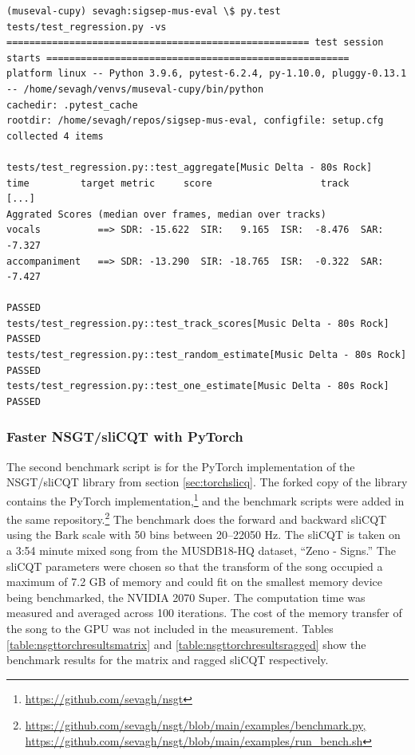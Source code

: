 \documentclass[report.tex]{subfiles}
\begin{document}
\begin{listing}[h]
  \centering
\begin{verbatim}
(museval-cupy) sevagh:sigsep-mus-eval \$ py.test tests/test_regression.py -vs
===================================================== test session starts =====================================================
platform linux -- Python 3.9.6, pytest-6.2.4, py-1.10.0, pluggy-0.13.1 -- /home/sevagh/venvs/museval-cupy/bin/python
cachedir: .pytest_cache
rootdir: /home/sevagh/repos/sigsep-mus-eval, configfile: setup.cfg
collected 4 items

tests/test_regression.py::test_aggregate[Music Delta - 80s Rock]     time         target metric     score                   track
[...]
Aggrated Scores (median over frames, median over tracks)
vocals          ==> SDR: -15.622  SIR:   9.165  ISR:  -8.476  SAR:  -7.327
accompaniment   ==> SDR: -13.290  SIR: -18.765  ISR:  -0.322  SAR:  -7.427

PASSED
tests/test_regression.py::test_track_scores[Music Delta - 80s Rock] PASSED
tests/test_regression.py::test_random_estimate[Music Delta - 80s Rock] PASSED
tests/test_regression.py::test_one_estimate[Music Delta - 80s Rock] PASSED
\end{verbatim}
  \caption{Passing regression test output for the CuPy GPU speedup}
  \label{lst:regressionout}
\end{listing}

\newpagefill

\subsubsection{Faster NSGT/sliCQT with PyTorch}

The second benchmark script is for the PyTorch implementation of the NSGT/sliCQT library from section \ref{sec:torchslicq}. The forked copy of the library contains the PyTorch implementation,\footnote{\url{https://github.com/sevagh/nsgt}} and the benchmark scripts were added in the same repository.\footnote{\url{https://github.com/sevagh/nsgt/blob/main/examples/benchmark.py, https://github.com/sevagh/nsgt/blob/main/examples/run_bench.sh}} The benchmark does the forward and backward sliCQT using the Bark scale with 50 bins between 20--22050 Hz. The sliCQT is taken on a 3:54 minute mixed song from the MUSDB18-HQ dataset, ``Zeno - Signs.'' The sliCQT parameters were chosen so that the transform of the song occupied a maximum of 7.2 GB of memory and could fit on the smallest memory device being benchmarked, the NVIDIA 2070 Super. The computation time was measured and averaged across 100 iterations. The cost of the memory transfer of the song to the GPU was not included in the measurement. Tables \ref{table:nsgttorchresultsmatrix} and \ref{table:nsgttorchresultsragged} show the benchmark results for the matrix and ragged sliCQT respectively.
\end{document}
